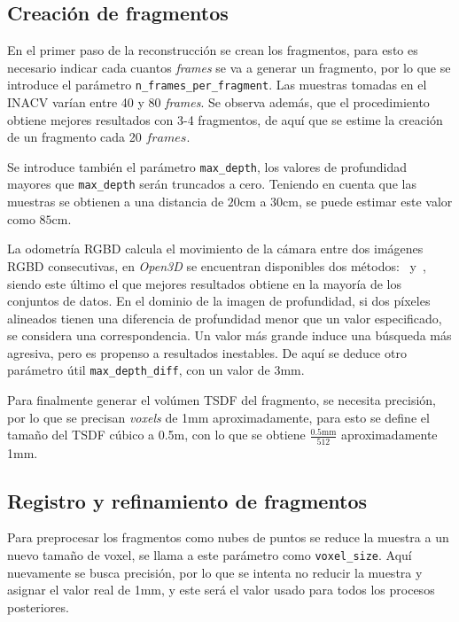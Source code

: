 \subsection{Creación de fragmentos}

En el primer paso de la reconstrucción se crean los fragmentos, para esto es necesario indicar cada cuantos \textit{frames} se va a generar un fragmento, por lo que se introduce el parámetro \verb|n_frames_per_fragment|. Las muestras tomadas en el INACV varían entre 40 y 80 \textit{frames}. Se observa además, que el procedimiento obtiene mejores resultados con 3-4 fragmentos, de aquí que se estime la creación de un fragmento cada 20 $frames$.

Se introduce también el parámetro \verb|max_depth|, los valores de profundidad mayores que \verb|max_depth| serán truncados a cero. Teniendo en cuenta que las muestras se obtienen a una distancia de $20\text{cm}$ a $30\text{cm}$, se puede estimar este valor como $85\text{cm}$.

La odometría RGBD calcula el movimiento de la cámara entre dos imágenes RGBD consecutivas, en \textit{Open3D} se encuentran disponibles dos métodos:~\cite{steinbrucker2011real} y~\cite{park2017colored}, siendo este último el que mejores resultados obtiene en la mayoría de los conjuntos de datos. En el dominio de la imagen de profundidad, si dos píxeles alineados tienen una diferencia de profundidad menor que un valor especificado, se considera una correspondencia. Un valor más grande induce una búsqueda más agresiva, pero es propenso a resultados inestables. De aquí se deduce otro parámetro útil \verb|max_depth_diff|, con un valor de $3\text{mm}$.

Para finalmente generar el volúmen TSDF del fragmento, se necesita precisión, por lo que se precisan \textit{voxels} de 1mm aproximadamente, para esto se define el tamaño del TSDF cúbico a 0.5m, con lo que se obtiene $\frac{0.5\text{mm}}{512}$ aproximadamente 1mm.

\subsection{Registro y refinamiento de fragmentos}

Para preprocesar los fragmentos como nubes de puntos se reduce la muestra a un nuevo tamaño de voxel, se llama a este parámetro como \verb|voxel_size|. Aquí nuevamente se busca precisión, por lo que se intenta no reducir la muestra y asignar el valor real de 1mm, y este será el valor usado para todos los procesos posteriores.

